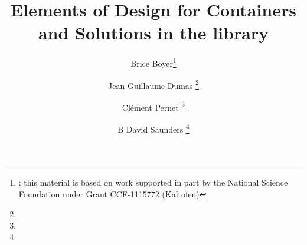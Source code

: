 \documentclass{article}
\title{Elements of Design for Containers and Solutions in the \linbox library}
\author{Brice Boyer\footnote{\mailto{bbboyer@ncsu.edu}; this material is based on work supported in part by the National Science Foundation
under Grant CCF-1115772 (Kaltofen)}
\and Jean-Guillaume Dumas
\footnote{\mailto{Jean-Guillaume.Dumas@imag.fr}}
\and Cl\'ement Pernet
 \footnote{\mailto{clement.pernet@imag.fr}}
\and B David Saunders
\footnote{\mailto{saunders@udel.edu}}
}
\date{}
\newif\ifAbstractOnly
\begin{document}
\maketitle



\ifAbstractOnly
\else



%

%
%
%

%
%
%
%


%

%
%
%
%

%
%
%
%
\fi %



%
%
\end{document}
